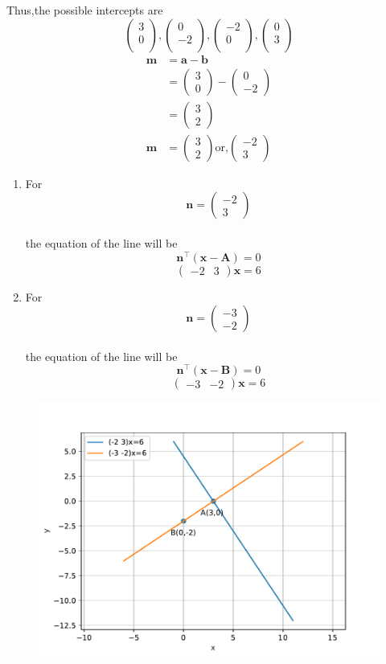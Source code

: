 \documentclass[10pt]{article}
\providecommand{\brak}[1]{\ensuremath{\left(#1\right)}}
\newcommand{\myvec}[1]{\ensuremath{\begin{pmatrix}#1\end{pmatrix}}}
\let\vec\mathbf{}
\begin{document}
Thus,the possible intercepts are\\
 $$\myvec{3\\ 0 \\} ,\myvec{0\\ -2 \\} ,\myvec{-2\\ 0 \\}, \myvec{0\\ 3 \\}$$ 
\begin{align}
\vec{m}&=\vec{a}-\vec{b}\\
&=\myvec{3\\0}-\myvec{0\\-2}\\
&=\myvec{3\\2}\\
\vec{m}&=\myvec{3\\2} \text{or,} \myvec{-2\\3}
\end{align}
\begin{enumerate}
\item For\\
$$\vec{n} = \myvec{ -2\\3}$$\\
the equation of the line will be\\
            $$\vec{n}^{\top}\brak{\vec{x}-\vec{A}}=0$$
            $$\myvec{-2&3}\vec{x}=6$$
\item For\\
$$\vec{n}=\myvec{-3\\-2}$$\\
the equation of the line will be\\
           $$\vec{n}^{\top}\brak{\vec{x}-\vec{B}}=0$$
           $$\myvec{-3&-2}\vec{x}=6$$
\end{enumerate}
\begin{figure}[!h]
	\begin{center}
		\includegraphics[width=\columnwidth]{./figs/fig.pdf}
	\end{center}
\caption{}
\label{figure}
\end{figure}
\end{document}
